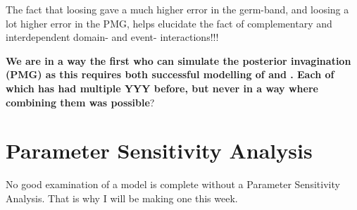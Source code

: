 

The fact that loosing  gave a much higher error in the germ-band, and loosing  a lot higher error in the PMG, helps elucidate the fact of complementary and interdependent domain- and event- interactions!!!


\textbf{We are in a way the first who can simulate the posterior invagination (PMG)  as this requires both successful modelling of  and . Each of which has had multiple YYY before, but never in a way where combining them was possible}?


\section{Parameter Sensitivity Analysis}
No good examination of a model is complete without a Parameter Sensitivity Analysis. That is why I will be making one this week.





